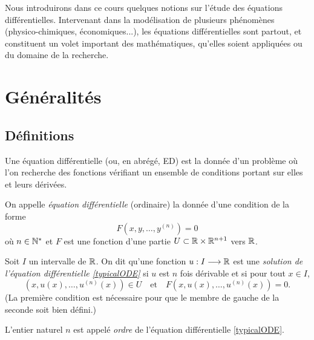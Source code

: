 \documentclass[../main.tex]{subfiles}
\begin{document}

    Nous introduirons dans ce cours quelques notions sur l'étude des équations différentielles. Intervenant dans la modélisation de plusieurs phénomènes (physico-chimiques, économiques...), les équations différentielles sont partout, et constituent un volet important des mathématiques, qu'elles soient appliquées ou du domaine de la recherche.

\section{Généralités}

\subsection{Définitions}

Une équation différentielle (ou, en abrégé, ED) est la donnée d'un problème où l'on recherche des fonctions vérifiant un ensemble de conditions portant sur elles et leurs dérivées.

\begin{mydef}

On appelle \textit{équation différentielle} (ordinaire) la donnée d'une condition de la forme
	\begin{equation}\label{typicalODE}
	F(x,y,\ldots,y^{(n)}) = 0
	\end{equation}
où $n\in\mathbb N^*$ et $F$ est une fonction d'une partie $U\subset\mathbb R\times\mathbb R^{n+1}$ vers $\mathbb R$.

Soit $I$ un intervalle de $\mathbb R$. On dit qu'une fonction $u:I\longrightarrow\mathbb R$ est une \textit{solution de l'équation différentielle \eqref{typicalODE}} si $u$ est $n$ fois dérivable et si pour tout $x\in I$, 
	\begin{equation*}
	(x,u(x),\ldots,u^{(n)}(x))\in U\quad\text{et}\quad
	    F(x,u(x),\ldots,u^{(n)}(x)) = 0.
    \end{equation*}
(La première condition est nécessaire pour que le membre de gauche de la seconde soit bien défini.)


L'entier naturel $n$ est appelé \textit{ordre} de l'équation différentielle \eqref{typicalODE}.
\end{mydef}
\end{document}
